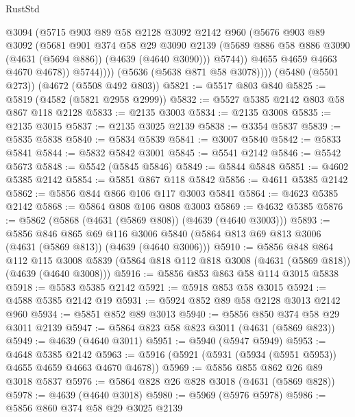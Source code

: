 \begin{lexlean}{RustStd}
\begin{coremodule}
{\begin{coremodule}
{{{{{{{{{{{{{{{{                  @3094
                  (@5715
                    @903
                    @89
                    @58
                    @2128
                    @3092
                    @2142
                    @960
                    (@5676
                      @903
                      @89
                      @3092
                      (@5681
                        @901
                        @374
                        @58
                        @29
                        @3090
                        @2139
                        (@5689 @886 @58 @886 @3090 (@4631 (@5694 @886)) (@4639 (@4640 @3090)))
                        @5744))
                    @4655
                    @4659
                    @4663
                    @4670
                    @4678))
                @5744))))
        (@5636 (@5638 @871 @58 @3078))))
    (@5480 (@5501 @273))
    (@4672 (@5508 @492 @803))
@5821 := @5517 @803 @840
@5825 := @5819 (@4582 (@5821 @2958 @2999))
@5832 := @5527 @5385 @2142 @803 @58 @867 @118 @2128
@5833 := @2135 @3003
@5834 := @2135 @3008
@5835 := @2135 @3015
@5837 := @2135 @3025 @2139
@5838 := @3354 @5837
@5839 := @5835 @5838
@5840 := @5834 @5839
@5841 := @3007 @5840
@5842 := @5833 @5841
@5844 := @5832 @5842 @3001
@5845 := @5541 @2142
@5846 := @5542 @5673
@5848 := @5542 (@5845 @5846)
@5849 := @5844 @5848
@5851 := @4602 @5385 @2142
@5854 := @5851 @867 @118 @5842
@5856 := @4611 @5385 @2142
@5862 := @5856 @844 @866 @106 @117 @3003 @5841
@5864 := @4623 @5385 @2142
@5868 := @5864 @808 @106 @808 @3003
@5869 := @4632 @5385
@5876 := @5862 (@5868 (@4631 (@5869 @808)) (@4639 (@4640 @3003)))
@5893 := @5856
    @846
    @865
    @69
    @116
    @3006
    @5840
    (@5864 @813 @69 @813 @3006 (@4631 (@5869 @813)) (@4639 (@4640 @3006)))
@5910 := @5856
    @848
    @864
    @112
    @115
    @3008
    @5839
    (@5864 @818 @112 @818 @3008 (@4631 (@5869 @818)) (@4639 (@4640 @3008)))
@5916 := @5856 @853 @863 @58 @114 @3015 @5838
@5918 := @5583 @5385 @2142
@5921 := @5918 @853 @58 @3015
@5924 := @4588 @5385 @2142 @19
@5931 := @5924 @852 @89 @58 @2128 @3013 @2142 @960
@5934 := @5851 @852 @89 @3013
@5940 := @5856 @850 @374 @58 @29 @3011 @2139
@5947 := @5864 @823 @58 @823 @3011 (@4631 (@5869 @823))
@5949 := @4639 (@4640 @3011)
@5951 := @5940 (@5947 @5949)
@5953 := @4648 @5385 @2142
@5963 := @5916 (@5921 (@5931 (@5934 (@5951 @5953)) @4655 @4659 @4663 @4670 @4678))
@5969 := @5856 @855 @862 @26 @89 @3018 @5837
@5976 := @5864 @828 @26 @828 @3018 (@4631 (@5869 @828))
@5978 := @4639 (@4640 @3018)
@5980 := @5969 (@5976 @5978)
@5986 := @5856 @860 @374 @58 @29 @3025 @2139
}}}}}}}}}}}}}}}}
\end{coremodule}}
\end{coremodule}
\end{lexlean}
